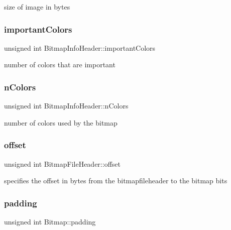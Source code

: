 size of image in bytes 

\mbox{\label{group__bitmap_ga9d87941fcc414085f7361fd89818ee3f}} 
\subsubsection{\texorpdfstring{important\+Colors}{importantColors}}
{\footnotesize\ttfamily unsigned int Bitmap\+Info\+Header\+::important\+Colors}



number of colors that are important 

\mbox{\label{group__bitmap_ga4c543a08d1b72bdda2329b426a213e2a}} 
\subsubsection{\texorpdfstring{n\+Colors}{nColors}}
{\footnotesize\ttfamily unsigned int Bitmap\+Info\+Header\+::n\+Colors}



number of colors used by the bitmap 

\mbox{\label{group__bitmap_ga26ed598693b100ffd9e29c4dc77f3d92}} 
\subsubsection{\texorpdfstring{offset}{offset}}
{\footnotesize\ttfamily unsigned int Bitmap\+File\+Header\+::offset}



specifies the offset in bytes from the bitmapfileheader to the bitmap bits 

\mbox{\label{group__bitmap_ga0ff33a06b37b2b310a499b4ef19fb490}} 
\subsubsection{\texorpdfstring{padding}{padding}}
{\footnotesize\ttfamily unsigned int Bitmap\+::padding}



